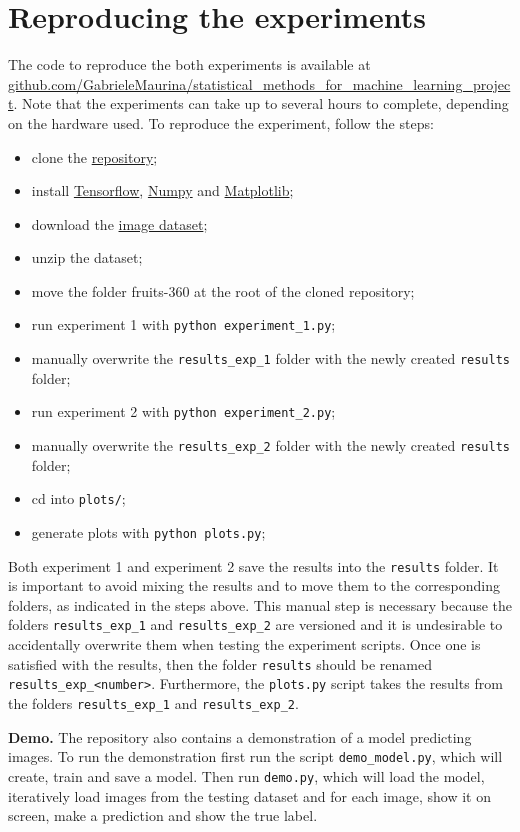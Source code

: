 \section{Reproducing the experiments}
\label{sec:repro}
The code to reproduce the both experiments is available at \href{https://github.com/GabrieleMaurina/statistical\_methods\_for\_machine\_learning\_project}{github.com/GabrieleMaurina/statistical\_methods\_for\_machine\_learning\_project}. Note that the experiments can take up to several hours to complete, depending on the hardware used. To reproduce the experiment, follow the steps:
\begin{itemize}
    \item clone the \href{https://github.com/GabrieleMaurina/statistical\_methods\_for\_machine\_learning\_project}{repository};
    \item install \href{https://pypi.org/project/tensorflow/}{Tensorflow}, \href{https://pypi.org/project/numpy/}{Numpy} and \href{https://pypi.org/project/matplotlib/}{Matplotlib};
    \item download the \href{https://www.kaggle.com/moltean/fruits}{image dataset};
    \item unzip the dataset;
    \item move the folder fruits-360 at the root of the cloned repository;
    \item run experiment 1 with \texttt{python experiment\_1.py};
    \item manually overwrite the \texttt{results\_exp\_1} folder with the newly created \texttt{results} folder;
    \item run experiment 2 with \texttt{python experiment\_2.py};
    \item manually overwrite the \texttt{results\_exp\_2} folder with the newly created \texttt{results} folder;
    \item cd into \texttt{plots/};
    \item generate plots with \texttt{python plots.py};
\end{itemize}
Both experiment 1 and experiment 2 save the results into the \texttt{results} folder. It is important to avoid mixing the results and to move them to the corresponding folders, as indicated in the steps above. This manual step is necessary because the folders \texttt{results\_exp\_1} and \texttt{results\_exp\_2} are versioned and it is undesirable to accidentally overwrite them when testing the experiment scripts. Once one is satisfied with the results, then the folder \texttt{results} should be renamed \texttt{results\_exp\_<number>}. Furthermore, the \texttt{plots.py} script takes the results from the folders \texttt{results\_exp\_1} and \texttt{results\_exp\_2}.

\textbf{Demo.} The repository also contains a demonstration of a model predicting images. To run the demonstration first run the script \texttt{demo\_model.py}, which will create, train and save a model. Then run \texttt{demo.py}, which will load the model, iteratively load images from the testing dataset and for each image, show it on screen, make a prediction and show the true label.
